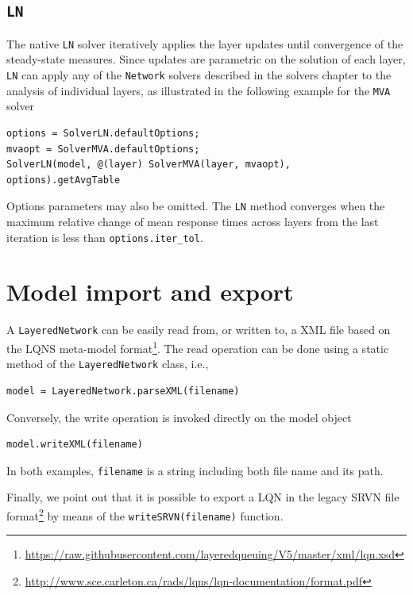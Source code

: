 \subsection{\texttt{LN}}
The native \texttt{LN} solver iteratively applies the layer updates until convergence of the steady-state measures. Since updates are parametric on the solution of each layer, \texttt{LN} can apply any of the \texttt{Network} solvers described in the solvers chapter to the analysis of individual layers, as illustrated in the following example for the \texttt{MVA} solver
\begin{lstlisting}
options = SolverLN.defaultOptions;
mvaopt = SolverMVA.defaultOptions;
SolverLN(model, @(layer) SolverMVA(layer, mvaopt), options).getAvgTable
\end{lstlisting}
Options parameters may also be omitted. The \texttt{LN} method converges when the maximum relative change of mean response times across layers from the last iteration is less than \texttt{options.iter\_tol}.

\section{Model import and export}
A \texttt{LayeredNetwork} can be easily read from, or written to, a XML file based on the LQNS meta-model format\footnote{\url{https://raw.githubusercontent.com/layeredqueuing/V5/master/xml/lqn.xsd}}. The read operation can be done using a static method of the \texttt{LayeredNetwork} class, i.e.,
\begin{lstlisting}
model = LayeredNetwork.parseXML(filename)
\end{lstlisting}
Conversely, the write operation is invoked directly on the model object
\begin{lstlisting}
model.writeXML(filename)
\end{lstlisting}
In both examples, \texttt{filename} is a string including both file name and its path.

Finally, we point out that it is possible to export a LQN in the legacy SRVN file format\footnote{\url{http://www.sce.carleton.ca/rads/lqns/lqn-documentation/format.pdf}} by means of the \texttt{writeSRVN(filename)} function.

